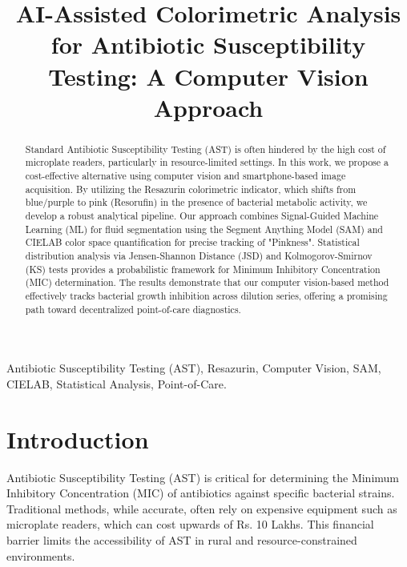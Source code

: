 \documentclass[conference]{IEEEtran}
\begin{document}
\title{AI-Assisted Colorimetric Analysis for Antibiotic Susceptibility Testing: A Computer Vision Approach}

\author{
  \and
}

\maketitle

\begin{abstract}
Standard Antibiotic Susceptibility Testing (AST) is often hindered by the high cost of microplate readers, particularly in resource-limited settings. In this work, we propose a cost-effective alternative using computer vision and smartphone-based image acquisition. By utilizing the Resazurin colorimetric indicator, which shifts from blue/purple to pink (Resorufin) in the presence of bacterial metabolic activity, we develop a robust analytical pipeline. Our approach combines Signal-Guided Machine Learning (ML) for fluid segmentation using the Segment Anything Model (SAM) and CIELAB color space quantification for precise tracking of "Pinkness". Statistical distribution analysis via Jensen-Shannon Distance (JSD) and Kolmogorov-Smirnov (KS) tests provides a probabilistic framework for Minimum Inhibitory Concentration (MIC) determination. The results demonstrate that our computer vision-based method effectively tracks bacterial growth inhibition across dilution series, offering a promising path toward decentralized point-of-care diagnostics.
\end{abstract}

\begin{IEEEkeywords}
Antibiotic Susceptibility Testing (AST), Resazurin, Computer Vision, SAM, CIELAB, Statistical Analysis, Point-of-Care.
\end{IEEEkeywords}

\section{Introduction}
Antibiotic Susceptibility Testing (AST) is critical for determining the Minimum Inhibitory Concentration (MIC) of antibiotics against specific bacterial strains. Traditional methods, while accurate, often rely on expensive equipment such as microplate readers, which can cost upwards of Rs. 10 Lakhs. This financial barrier limits the accessibility of AST in rural and resource-constrained environments.
\end{document}
